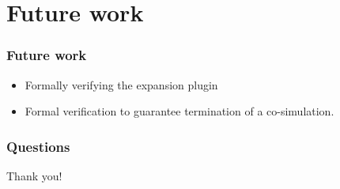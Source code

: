 \documentclass{beamer}
\begin{document}
\section{Future work}

\begin{frame}
\frametitle{Future work}
\begin{itemize}
    \item Formally verifying the expansion plugin  
    \item Formal verification to guarantee termination of a co-simulation.
\end{itemize}
\end{frame}

\begin{frame}
\frametitle{Questions}
\huge
Thank you!
\end{frame}
\end{document}
